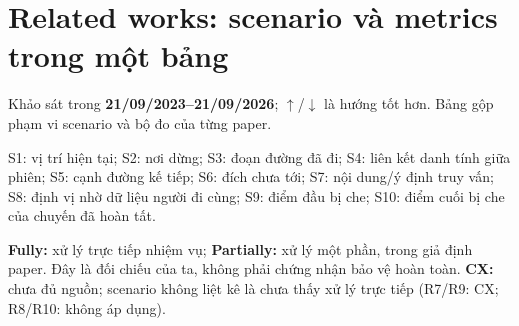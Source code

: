 \section{Related works: scenario và metrics trong một bảng}
Khảo sát trong \textbf{21/09/2023–21/09/2026}; $\uparrow$/$\downarrow$ là hướng tốt hơn. Bảng gộp phạm vi scenario và bộ đo của từng paper.

S1: vị trí hiện tại; S2: nơi dừng; S3: đoạn đường đã đi; S4: liên kết danh tính giữa phiên; S5: cạnh đường kế tiếp; S6: đích chưa tới; S7: nội dung/ý định truy vấn; S8: định vị nhờ dữ liệu người đi cùng; S9: điểm đầu bị che; S10: điểm cuối bị che của chuyến đã hoàn tất.

\textbf{Fully:} xử lý trực tiếp nhiệm vụ; \textbf{Partially:} xử lý một phần, trong giả định paper. Đây là đối chiếu của ta, không phải chứng nhận bảo vệ hoàn toàn. \textbf{CX:} chưa đủ nguồn; scenario không liệt kê là chưa thấy xử lý trực tiếp (R7/R9: CX; R8/R10: không áp dụng).

